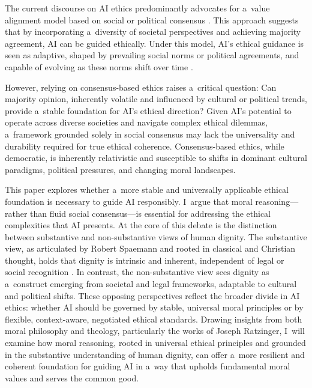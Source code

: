 \documentclass[%
  manuscript=article,
  year=2024,
  volume=77,
  doi=00000.000,
]{zfn}
\begin{document}
The current discourse on AI ethics predominantly advocates for a~value alignment model based on social or political consensus 
\parencite[][]{gabriel_artificial_2020}. %
 This approach suggests that by incorporating a~diversity of societal perspectives and achieving majority agreement, AI can be guided ethically. Under this model, AI's ethical guidance is seen as adaptive, shaped by prevailing social norms or political agreements, and capable of evolving as these norms shift over time 
\parencite[][]{world_economic_forum_ai_2024}.%




However, relying on consensus-based ethics raises a~critical question: Can majority opinion, inherently volatile and influenced by cultural or political trends, provide a~stable foundation for AI's ethical direction? Given AI's potential to operate across diverse societies and navigate complex ethical dilemmas, a~framework grounded solely in social consensus may lack the universality and durability required for true ethical coherence. Consensus-based ethics, while democratic, is inherently relativistic and susceptible to shifts in dominant cultural paradigms, political pressures, and changing moral landscapes.



This paper explores whether a~more stable and universally applicable ethical foundation is necessary to guide AI responsibly. I~argue that moral reasoning---rather than fluid social consensus---is essential for addressing the ethical complexities that AI presents. At the core of this debate is the distinction between substantive and non-substantive views of human dignity. The substantive view, as articulated by Robert Spaemann and rooted in classical and Christian thought, holds that dignity is intrinsic and inherent, independent of legal or social recognition 
\parencite[][]{spaemann_love_2012}. %
 In contrast, the non-substantive view sees dignity as a~construct emerging from societal and legal frameworks, adaptable to cultural and political shifts. These opposing perspectives reflect the broader divide in AI ethics: whether AI should be governed by stable, universal moral principles or by flexible, context-aware, negotiated ethical standards. Drawing insights from both moral philosophy and theology, particularly the works of Joseph Ratzinger, I~will examine how moral reasoning, rooted in universal ethical principles and grounded in the substantive understanding of human dignity, can offer a~more resilient and coherent foundation for guiding AI in a~way that upholds fundamental moral values and serves the common good.
\end{document}
